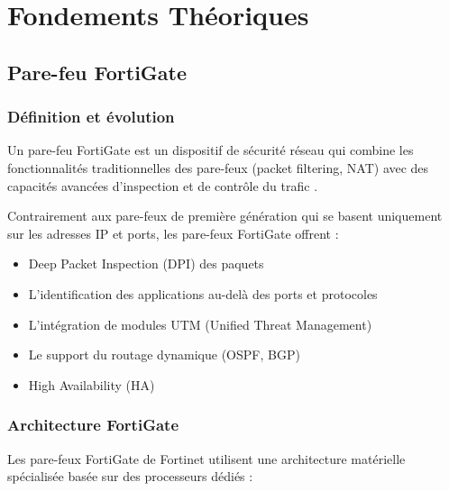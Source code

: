 \chapter{Fondements Théoriques}
\label{chap:theorie}

\section{Pare-feu FortiGate}

\subsection{Définition et évolution}

Un pare-feu FortiGate est un dispositif de sécurité réseau qui combine les fonctionnalités traditionnelles des pare-feux (packet filtering, NAT) avec des capacités avancées d'inspection et de contrôle du trafic \cite{1}.

Contrairement aux pare-feux de première génération qui se basent uniquement sur les adresses IP et ports, les pare-feux FortiGate offrent :
\begin{itemize}
    \item Deep Packet Inspection (DPI) des paquets
    \item L'identification des applications au-delà des ports et protocoles
    \item L'intégration de modules UTM (Unified Threat Management)
    \item Le support du routage dynamique (OSPF, BGP)
    \item High Availability (HA)
\end{itemize}

\subsection{Architecture FortiGate}

Les pare-feux FortiGate de Fortinet utilisent une architecture matérielle spécialisée basée sur des processeurs dédiés :

